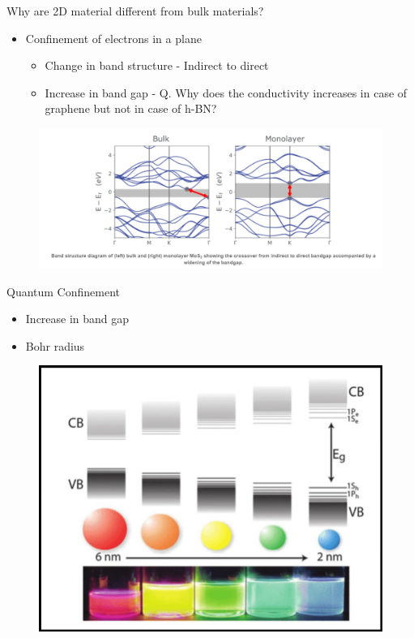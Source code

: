 \documentclass{beamer}
\begin{document}
\begin{frame}{Why are 2D material different from bulk materials?}
    \begin{itemize}
        \item Confinement of electrons in a plane
        \begin{itemize}
            \item Change in band structure - Indirect to direct
            \item Increase in band gap - Q. Why does the conductivity increases in case of graphene but not in case of h-BN?
        \end{itemize}
    \end{itemize}
    
    \begin{figure}
        \centering
        \includegraphics[scale=0.5]{confinement.PNG}
    \end{figure}
\end{frame}

\begin{frame}{Quantum Confinement}
    \begin{itemize}
        \item Increase in band gap
        \item Bohr radius
    \end{itemize}
    \begin{figure}
        \centering
        \includegraphics[scale = 0.3]{Quantum Confinement.png}
    \end{figure}
\end{frame}
\end{document}

